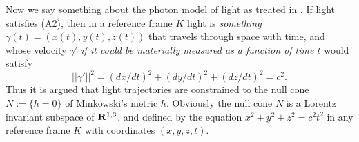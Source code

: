 \documentclass[12pt]{article}
\newcommand{\del}{\partial}
\begin{document}













Now we say something about the photon model of light as treated in \cite[III.XI.6, pp.301]{levi}. If light satisfies (A2), then in a reference frame $K$ light is \emph{something} $\gamma(t)=(x(t),y(t),z(t))$ that travels through space with time, and whose velocity $\gamma'$ \emph{if it could be materially measured as a function of time $t$} would satisfy \begin{equation}\label{vel} 
||\gamma'||^2=(dx/dt)^2+(dy/dt)^2+(dz/dt)^2=c^2.
\end{equation} Thus it is argued that light trajectories are constrained to the null cone $N:=\{h=0\}$ of Minkowski's metric $h$. Obviously the null cone $N$ is a Lorentz invariant subspace of ${\bf{R}}^{1,3}$. and defined by the equation $x^2+y^2+z^2=c^2 t^2$ in any reference frame $K$ with coordinates $(x,y,z,t)$.   

\end{document}
